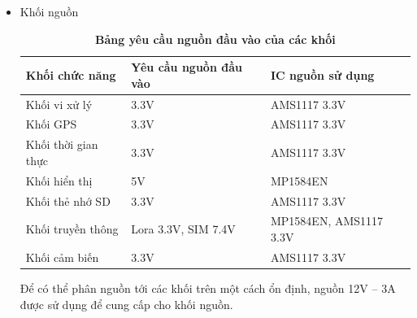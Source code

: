 \documentclass{article} %
\begin{document}
	\begin{itemize}
		
		
		\item Khối nguồn
		\begin{table}[H]
			\centering
			\begin{tabular}{|l|l|l|}
				\hline
				Khối chức năng      & Yêu cầu nguồn đầu vào & IC nguồn sử dụng       \\ \hline
				Khối vi xử lý       & 3.3V                  & AMS1117 3.3V           \\ \hline
				Khối GPS            & 3.3V                  & AMS1117 3.3V           \\ \hline
				Khối thời gian thực & 3.3V                  & AMS1117 3.3V           \\ \hline
				Khối hiển thị       & 5V                    & MP1584EN               \\ \hline
				Khối thẻ nhớ SD     & 3.3V                  & AMS1117 3.3V           \\ \hline
				Khối truyền thông   & Lora 3.3V, SIM 7.4V   & MP1584EN, AMS1117 3.3V \\ \hline
				Khối cảm biến       & 3.3V                  & AMS1117 3.3V           \\ \hline
			\end{tabular}
			\caption[Bảng yêu cầu nguồn đầu vào của các khối ]{\bfseries\fontsize{12pt}{0pt}\selectfont Bảng yêu cầu nguồn đầu vào của các khối }
		\end{table}
		
		Để có thể phân nguồn tới các khối trên một cách ổn định, nguồn 12V – 3A được sử dụng để cung cấp cho khối nguồn.
		

\end{itemize}
\end{document}
